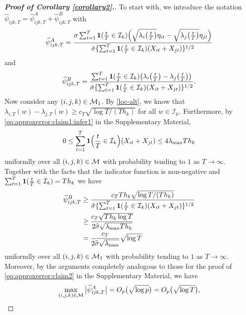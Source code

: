 \documentclass[a4paper,12pt]{article}
\numberwithin{equation}{section}
\begin{document}
\begin{proof}[\textnormal{\textbf{Proof of Corollary \ref{corollary2}.}}]



To start with, we introduce the notation $\widehat{\psi}_{ijk, T} = \widehat{\psi}_{ijk, T}^A + \widehat{\psi}_{ijk, T}^B$ with
\[ \widehat{\psi}_{ijk, T}^A = \frac{\sigma \sum\nolimits_{t=1}^T \boldsymbol{1}(\frac{t}{T} \in \mathcal{I}_k) \Big(\sqrt{\lambda_{i}\big(\frac{t}{T}\big)} \eta_{it} - \sqrt{\lambda_{j}\big(\frac{t}{T}\big)}\eta_{jt}\Big)}{ \hat{\sigma} \{ \sum\nolimits_{t=1}^T \boldsymbol{1}(\frac{t}{T} \in \mathcal{I}_k) (X_{it} + X_{jt}) \}^{1/2}} \]
and
\[ \widehat{\psi}_{ijk, T}^B = \frac{\sum\nolimits_{t=1}^T \boldsymbol{1}(\frac{t}{T} \in \mathcal{I}_k) \big(\lambda_{i}\big(\frac{t}{T}\big) - \lambda_{j}\big(\frac{t}{T}\big)\big)}{ \hat{\sigma} \{ \sum\nolimits_{t=1}^T \boldsymbol{1}(\frac{t}{T} \in \mathcal{I}_k) (X_{it} + X_{jt}) \}^{1/2}}. \]
Now consider any $(i, j, k) \in \mathcal{M}_1$. By \eqref{loc-alt}, we know that $\lambda_{i, T}(w) - \lambda_{j, T}(w) \ge c_T \sqrt{\log T / (Th_{k})}$ for all $w \in \mathcal{I}_{k}$. Furthermore, by \eqref{eq:approxerror:claim1:infer1} in the Supplementary Material,
\begin{align*}
0 \le\sum\limits_{t=1}^T \boldsymbol{1}\Big(\frac{t}{T} \in \mathcal{I}_k\Big) (X_{i t} + X_{j t}) \le 4 \lambda_{\max} T h_k
\end{align*}
uniformlly over all $(i, j, k) \in \mathcal{M}$ with probability tending to $1$ as $T \to \infty$. Together with the facts that the indicator function is non-negative and $\sum\nolimits_{t=1}^T \boldsymbol{1}(\frac{t}{T} \in \mathcal{I}_k) = T h_k$ we have
\begin{align}\label{eq:psiB}
\widehat{\psi}_{i j k, T}^B &\ge \frac{c_T T h_{k} \sqrt{\log T / (T h_k)}}{ \hat{\sigma} \{ \sum\nolimits_{t=1}^T \boldsymbol{1}(\frac{t}{T} \in \mathcal{I}_{k}) (X_{i t} + X_{j t}) \}^{1/2}} \nonumber \\
& \ge  \frac{c_T\sqrt{T h_{k} \log T}}{2 \widehat{\sigma} \sqrt{ \lambda_{\max}T h_{k}}}\nonumber \\
& =\frac{ c_T}{2\widehat{\sigma} \sqrt{\lambda_{\max}}} \sqrt{\log T}
\end{align}
uniformlly over all $(i, j, k) \in \mathcal{M}_1$ with probability tending to $1$ as $T \to \infty$. Moreover, by the arguments completely analogous to those for the proof of \eqref{eq:approxerror:claim2} in the Supplementary Material, we have
\begin{align}\label{eq:psiA}
\max_{(i,j,k) \in \indexset} \big|\widehat\psi_{ijk,T}^A\big|  = O_p\big(\sqrt{\log p}\big) = O_p\big(\sqrt{\log T}\big),

\end{align}
\end{proof}
\end{document}
